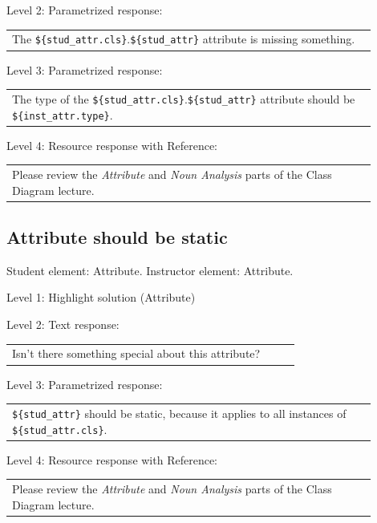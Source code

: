 \noindent Level 2: Parametrized response: \medskip

\begin{tabular}{|p{0.9\linewidth}}
The \verb|${stud_attr.cls}|.\verb|${stud_attr}| attribute is missing something.
\end{tabular} \medskip

\noindent Level 3: Parametrized response: \medskip

\begin{tabular}{|p{0.9\linewidth}}
The type of the \verb|${stud_attr.cls}|.\verb|${stud_attr}| attribute should be \verb|${inst_attr.type}|.
\end{tabular} \medskip

\noindent Level 4: Resource response with Reference: \medskip

\begin{tabular}{|p{0.9\linewidth}}
Please review the \textit{Attribute} and \textit{Noun Analysis} parts of the Class Diagram lecture.
\end{tabular} \medskip


\subsection{Attribute should be static}

Student element: Attribute. Instructor element: Attribute. \medskip

\noindent Level 1: Highlight solution (Attribute) \medskip

\noindent Level 2: Text response: \medskip

\begin{tabular}{|p{0.9\linewidth}}
Isn't there something special about this attribute?
\end{tabular} \medskip

\noindent Level 3: Parametrized response: \medskip

\begin{tabular}{|p{0.9\linewidth}}
\verb|${stud_attr}| should be static, because it applies to all instances of \verb|${stud_attr.cls}|.
\end{tabular} \medskip

\noindent Level 4: Resource response with Reference: \medskip

\begin{tabular}{|p{0.9\linewidth}}
Please review the \textit{Attribute} and \textit{Noun Analysis} parts of the Class Diagram lecture.
\end{tabular} \medskip


